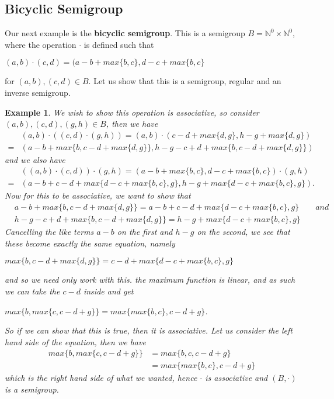\documentclass[12pt]{article}
\newtheorem{ex}[theorem]{Example}
\begin{document}
\subsection{Bicyclic Semigroup}
Our next example is the \textbf{bicyclic semigroup}. This is a semigroup $B = \mathbb{N}^0 \times \mathbb{N}^0$, where the operation $\cdot$ is defined such that
	\begin{center}
		$(a,b)\cdot(c,d) = (a - b + max\{b,c\},d - c + max\{b,c\}$
	\end{center}
for $(a,b), (c,d) \in B$. Let us show that this is a semigroup, regular and an inverse semigroup.
\begin{ex}
	We wish to show this operation is associative, so consider $(a,b),(c,d),(g,h) \in B$, then we have
	\begin{align*}
		&(a,b)\cdot ((c,d)\cdot(g,h)) = (a,b) \cdot (c-d+max\{d,g\},h-g+max\{d,g\})\\
		=&(a-b+max\{b,c-d+max\{d,g\}\},h-g-c+d+max\{b,c-d+max\{d,g\}\})
	\end{align*}
	and we also have
	\begin{align*}
		&((a,b)\cdot(c,d))\cdot(g,h) = (a-b + max\{b,c\},d-c + max\{b,c\})\cdot (g,h)\\
		=&(a-b+c-d + max\{d-c+max\{b,c\},g\},h-g + max\{d-c + max\{b,c\},g\}).
	\end{align*}
Now for this to be associative, we want to show that
	\begin{align*}
		&a-b+max\{b,c-d+max\{d,g\}\} = a-b+c-d + max\{d-c+max\{b,c\},g\} \qquad and\\[3mm]
		&h-g-c+d+max\{b,c-d+max\{d,g\}\} = h-g + max\{d-c + max\{b,c\},g\}
	\end{align*}
Cancelling the like terms $a-b$ on the first and $h-g$ on the second, we see that these become exactly the same equation, namely
	\begin{center}
		$max\{b,c-d+max\{d,g\}\} = c-d + max\{d-c+max\{b,c\},g\}$
	\end{center}
and so we need only work with this. the maximum function is linear, and as such we can take the $c-d$ inside and get
	\begin{center}
		$max\{b,max\{c,c-d+g\}\} = max\{max\{b,c\},c-d+g\}$.
	\end{center}
So if we can show that this is true, then it is associative. Let us consider the left hand side of the equation, then we have
	\begin{align*}
		max\{b,max\{c,c-d+g\}\} &= max\{b,c,c-d+g\}\\
						&= max\{max\{b,c\},c-d+g\}
	\end{align*}
which is the right hand side of what we wanted, hence $\cdot$ is associative and $(B,\cdot)$ is a semigroup.
\end{ex}
\end{document}
